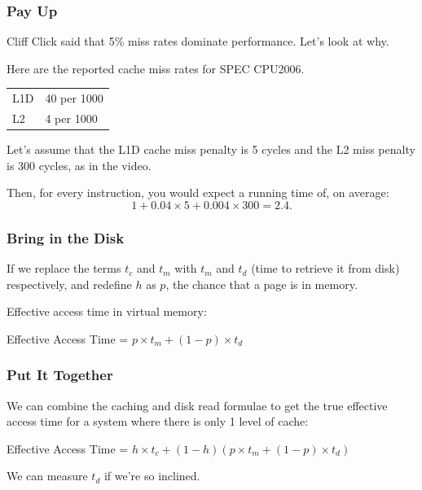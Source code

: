 \begin{frame}
\frametitle{Pay Up}

Cliff Click said that 5\% miss rates dominate performance. Let's look at why.

Here are the reported cache miss rates for SPEC CPU2006.

\begin{center}
\begin{tabular}{ll}
L1D & 40 per 1000 \\
L2 & 4 per 1000
\end{tabular}
\end{center}

Let's assume that the L1D cache miss penalty is 5 cycles and the L2 miss penalty is
300 cycles, as in the video. 

Then, for every instruction, you would expect a running
time of, on average:
\[ 1 + 0.04 \times 5 + 0.004 \times 300 = 2.4. \]

\end{frame}



\begin{frame}
\frametitle{Bring in the Disk}

If we replace the terms $t_{c}$ and $t_{m}$ with $t_{m}$ and $t_{d}$ (time to retrieve it from disk) respectively, and redefine $h$ as $p$, the chance that a page is in memory.

Effective access time in virtual memory: 

\begin{center}
	Effective Access Time = $ p \times t_{m} + (1 - p) \times t_{d}$
\end{center}


\end{frame}



\begin{frame}
\frametitle{Put It Together}

We can combine the caching and disk read formulae to get the true effective access time for a system where there is only 1 level of cache:

\begin{center}
	Effective Access Time = $ h \times t_{c} + (1 - h) ( p \times t_{m} + (1 - p) \times t_{d})$
\end{center}

We can measure $t_{d}$ if we're so inclined.

\end{frame}


